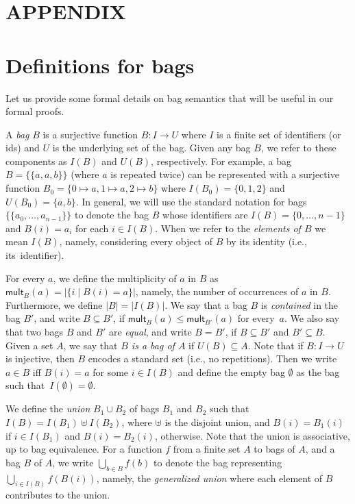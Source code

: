\documentclass[
a4paper
]{article}
\theoremstyle{plain}
\theoremstyle{definition}
\theoremstyle{remark}
\newcommand{\mult}[2]{\operatorname{mult}_{#1}(#2)}
\newcommand{\multiset}[1]{\{\!\!\{#1\}\!\!\}}
\renewcommand{\operatorname}[1]{\textsf{#1}}
\begin{document}



\newpage
\appendix

\section*{APPENDIX}

\section{Definitions for bags}\label{sec:defnAppendix}

Let us provide some formal details on bag semantics that will be useful in our formal proofs.

A \emph{bag} $B$ is a surjective function $B: I \rightarrow U$ where $I$ is a finite set of identifiers (or ids) and $U$ is the underlying set of the bag. Given any bag $B$, we refer to these components as $I(B)$ and $U(B)$, respectively. For example, a bag $B = \multiset{a, a, b}$ (where $a$ is repeated twice) can be represented with a surjective function $B_0 =\{0 \mapsto a, 1 \mapsto a, 2 \mapsto b\}$ where $I(B_0) = \{0, 1, 2\}$ and $U(B_0) = \{a,b\}$. In general, we will use the standard notation for bags $\multiset{a_0, \ldots, a_{n-1}}$ to denote the bag $B$ whose identifiers are $I(B) = \{0, \ldots, n{-}1\}$ and $B(i) = a_i$ for each $i \in I(B)$. 
When we refer to the \emph{elements of $B$} we mean $I(B)$, namely, considering every object of $B$ by its identity (i.e., its~identifier).

For every $a$, we define the multiplicity of $a$ in $B$ as $\mult{B}{a} = |\{i \mid B(i) = a\}|$, namely, the number of occurrences of $a$ in $B$. Furthermore, we define $|B| = |I(B)|$. We say that a bag $B$ is \emph{contained} in the bag $B'$, and write $B \subseteq B'$, if $\mult{B}{a} \leq \mult{B'}{a}$ for every~$a$. We also say that two bags $B$ and $B'$ are \emph{equal}, and write $B = B'$, if $B \subseteq B'$ and $B' \subseteq B$.
Given a set $A$, we say that \emph{$B$ is a bag of $A$} if $U(B) \subseteq A$.
Note that if $B: I \rightarrow U$ is injective, then $B$ encodes a standard set (i.e., no repetitions). Then we write $a \in B$ iff $B(i) = a$ for some $i \in I(B)$ and define the empty bag $\emptyset$ as the bag such that~$I(\emptyset) = \emptyset$.

We define the \emph{union} $B_1 \cup B_2$ of bags $B_1$ and $B_2$ such that $I(B) = I(B_1) \uplus I(B_2)$, where $\uplus$ is the disjoint union, and $B(i) = B_1(i)$ if $i\in I(B_1)$ and $B(i)= B_2(i)$, otherwise.
Note that the union is associative, up to bag equivalence.
For a function $f$ from a finite set $A$ to bags of $A$, and a bag $B$ of $A$, we write $\bigcup_{b \in B} f(b)$ to denote the bag representing $\bigcup_{i \in I(B)} f(B(i))$, namely, the \emph{generalized union} where each element of $B$ contributes to the union.   
\end{document}

